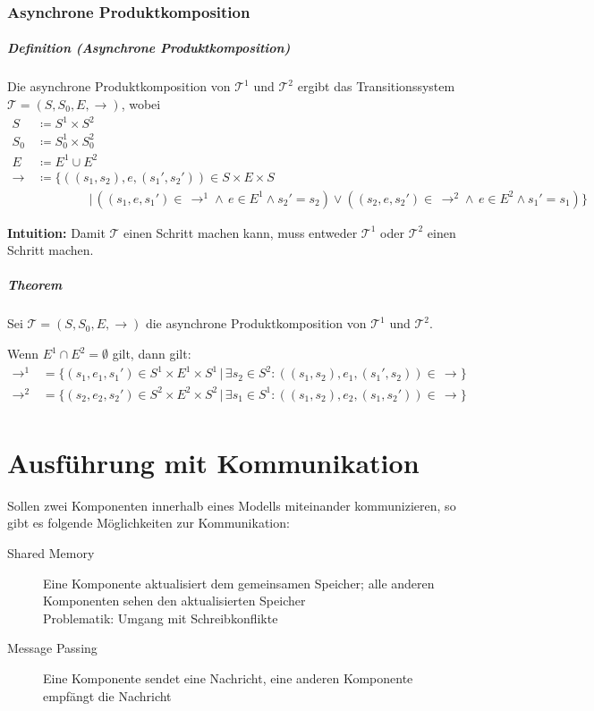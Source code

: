 \documentclass[a4paper, 11pt, accentcolor = tud3b]{tudreport}
\newcommand{\forwhich}{\ensuremath{{\,\vert\,}}}
\newcommand{\subsubparagraph}[1]{\hspace{1cm} \textbf{#1:}}
\newcommand{\definition}[2]{\subparagraph{Definition (#1)} #2}
\newcommand{\theorem}[1]{\subparagraph{Theorem} #1}
\newcommand{\intuition}[1]{\subsubparagraph{Intuition} #1}
\begin{document}
			    \subsubsection{Asynchrone Produktkomposition}
				    \definition{Asynchrone Produktkomposition}{
				    	Die asynchrone Produktkomposition von $ \mathcal{T} ^ 1 $ und $ \mathcal{T} ^ 2 $ ergibt das Transitionssystem $ \mathcal{T} = (S, S _ 0, E, \rightarrow) $, wobei
				    	\begin{align*}
					    	S &\coloneqq S ^ 1 \times S ^ 2 \\
					    	S _ 0 &\coloneqq S _ 0 ^ 1 \times S _ 0 ^ 2 \\
					    	E &\coloneqq E ^ 1 \cup E ^ 2 \\
					    	\rightarrow\, &\coloneqq \{ ((s _ 1, s _ 2), e, (s _ 1 ', s _ 2 ')) \in S \times E \times S \\
					    	& \quad\quad\quad\quad \forwhich ((s _ 1, e, s _ 1 ') \in \,\rightarrow ^ 1 \land \, e \in E ^ 1 \land s _ 2 ' = s _ 2) \lor ((s _ 2, e, s _ 2 ') \in \,\rightarrow ^ 2 \land \, e \in E ^ 2 \land s _ 1 ' = s _ 1) \}
				    	\end{align*}
				    	
				    	\intuition{Damit $ \mathcal{T} $ einen Schritt machen kann, muss entweder $ \mathcal{T} ^ 1 $ oder $ \mathcal{T} ^ 2 $ einen Schritt machen.}
				    }
				    
				    \theorem{
				    	Sei $ \mathcal{T} = (S, S _ 0, E, \rightarrow) $ die asynchrone Produktkomposition von $ \mathcal{T} ^ 1 $ und $ \mathcal{T} ^ 2 $.
				    	
				    	Wenn $ E ^ 1 \cap E ^ 2 = \emptyset $ gilt, dann gilt:
				    	\begin{align*}
					    	\rightarrow ^ 1 \, &= \{ (s _ 1, e _ 1, s _ 1 ') \in S ^ 1 \times E ^ 1 \times S ^ 1 \forwhich \exists s _ 2 \in S ^ 2 : ((s _ 1, s _ 2), e _ 1, (s _ 1 ', s _ 2)) \in \,\rightarrow \} \\
					    	\rightarrow ^ 2 \, &= \{ (s _ 2, e _ 2, s _ 2 ') \in S ^ 2 \times E ^ 2 \times S ^ 2 \forwhich \exists s _ 1 \in S ^ 1 : ((s _ 1, s _ 2), e _ 2, (s _ 1, s _ 2 ')) \in \,\rightarrow \} \\
				    	\end{align*}
				    }
	    
		    \section{Ausführung mit Kommunikation}
			    Sollen zwei Komponenten innerhalb eines Modells miteinander kommunizieren, so gibt es folgende Möglichkeiten zur Kommunikation:
			    \begin{description}
			    	\item[Shared Memory] Eine Komponente aktualisiert dem gemeinsamen Speicher; alle anderen Komponenten sehen den aktualisierten Speicher \\
				    	Problematik: Umgang mit Schreibkonflikte
			    	\item[Message Passing] Eine Komponente sendet eine Nachricht, eine anderen Komponente empfängt die Nachricht
			    \end{description}
			    
\end{document}
